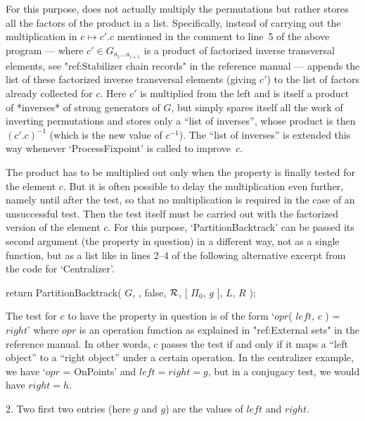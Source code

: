For this purpose, {\GAP} does  not actually multiply the permutations but
rather stores  all the factors of the   product in a  list. Specifically,
instead of carrying out  the multiplication in $c\mapsto c'.c$  mentioned
in  the   comment  to  line~5 of  the   above  program   --- where $c'\in
G_{a_1\ldots  a_{i+1}}$ is a  product  of factorized inverse  transversal
elements, see "ref:Stabilizer chain records" in the reference manual  ---
{\GAP} appends the list of these factorized inverse transversal  elements
(giving $c'$) to the list of factors already collected for $c$. Here $c'$
is multiplied from the left and is itself  a  product  of  *inverses*  of
strong generators of $G$, but {\GAP} simply spares itself all the work of
inverting permutations and stores only  a  ``list  of  inverses'',  whose
product is then $(c'.c)^{-1}$ (which is the new value of  $c^{-1}$).  The
``list of inverses'' is extended this way whenever  `ProcessFixpoint'  is
called to improve~$c$.

The  product has to be multiplied  out only when  the property is finally
tested  for  the  element $c$. But  it  is  often possible  to  delay the
multiplication  even  further, namely  until after   the test, so  that no
multiplication is required in the case of  an unsuccessful test. Then the
test  itself  must be carried   out with the  factorized   version of the
element $c$.  For  this purpose,  `PartitionBacktrack' can  be passed its
second argument (the property  in question) in  a different way, not as a
single {\GAP} function, but as a list like in lines 2--4 of the following
alternative excerpt from the code for `Centralizer'.

\) return PartitionBacktrack( $G$,
\) \quad [ $g$, $g$,
\)\kernttindent 3 \qquad OnPoints,
\)\kernttindent 4 \qquad $c$ -> $c$!.lftObj = $c$!.rgtObj ],
\) \quad false, ${\cal R}$, [ $\Pi_0$, $g$ ], $L$, $R$ );

The test for $c$ to have the property in question  is of the form `$opr$(
$left$,  $c$  )  =  $right$' where  $opr$   is an  operation  function as
explained in "ref:External sets" in the reference manual. In other words,
$c$ passes the test if and only if it maps a ``left object'' to a ``right
object'' under  a certain operation. In  the centralizer example, we have
`$opr$ =  OnPoints' and $left = right  = g$, but  in a conjugacy test, we
would have $right = h$.

\beginlist%

\item{2.}
Two first two entries (here $g$ and $g$) are the  values  of  $left$  and
$right$.

